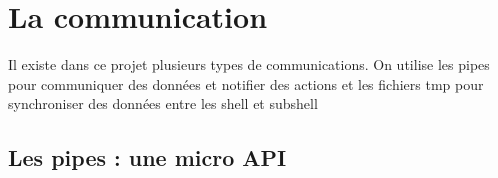 \documentclass{article}
\begin{document}
\newpage


\section{La communication}

Il existe dans ce projet plusieurs types de communications. On utilise les pipes pour communiquer des données et notifier des actions et les fichiers tmp pour synchroniser des données entre les shell et subshell  

\subsection{Les pipes : une micro API}
\end{document}
